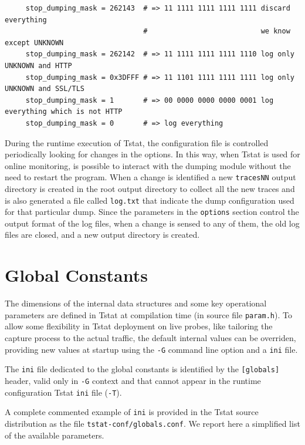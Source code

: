 \documentclass[11pt]{article}
\begin{document}
\begin{small}\begin{verbatim}
     stop_dumping_mask = 262143  # => 11 1111 1111 1111 1111 discard everything 
                                 #                           we know except UNKNOWN
     stop_dumping_mask = 262142  # => 11 1111 1111 1111 1110 log only UNKNOWN and HTTP
     stop_dumping_mask = 0x3DFFF # => 11 1101 1111 1111 1111 log only UNKNOWN and SSL/TLS
     stop_dumping_mask = 1       # => 00 0000 0000 0000 0001 log everything which is not HTTP
     stop_dumping_mask = 0       # => log everything
\end{verbatim}\end{small} \noindent
During the runtime execution of Tstat, the configuration file is controlled periodically
looking for changes in the options. In this way, when Tstat is used for online monitoring, 
is possible to interact with the dumping module without the need to restart the program. 
When a change is identified a new \texttt{tracesNN} output directory is created
in the root output directory to collect all the new traces 
and is also generated a file called \texttt{log.txt} that indicate the dump configuration 
used for that particular dump.
Since the parameters in the \texttt{options} section control the output format of the log files,
when a change is sensed to any of them, the old log files are closed, and a new output directory
is created.

\section{Global Constants\label{Global_Constants}}


The dimensions of the internal data structures and some key operational parameters are defined 
in Tstat at compilation time (in source file \texttt{param.h}). 
To allow some flexibility in Tstat deployment on live probes, like tailoring the capture process
to the actual traffic, the default internal values can be overriden,
providing new values at startup using the \texttt{-G} command line option and a \texttt{ini} file.



The \texttt{ini} file dedicated to the global constants is identified by the \texttt{[globals]} header, 
valid only in \texttt{-G} context and that cannot appear in the runtime configuration Tstat \texttt{ini} 
file (\texttt{-T}).



A complete commented example of \texttt{ini} is provided in the Tstat source distribution as the file 
\texttt{tstat-conf/globals.conf}. We report here a simplified list of the available parameters.
\end{document}
